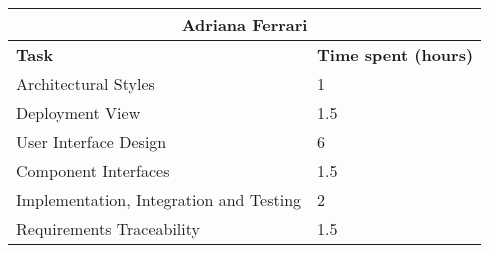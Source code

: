 \begin{table}[H]
  \center
  \begin{tabular}{l|l}
    \multicolumn{2}{c}{\textbf{Adriana Ferrari}} \\
    \hline
    \textbf{Task} & \textbf{Time spent (hours)}\\
    \hline
    Architectural Styles & 1 \\
    Deployment View & 1.5 \\
    User Interface Design & 6 \\
    Component Interfaces & 1.5 \\ 
    Implementation, Integration and Testing & 2 \\
    Requirements Traceability & 1.5 \\
  \end{tabular}
\end{table}